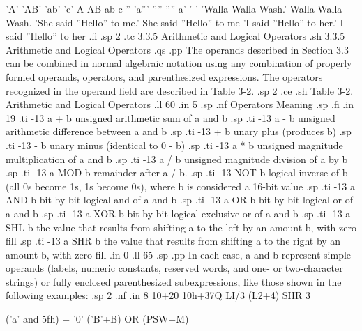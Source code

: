      'A' 'AB' 'ab' 'c'               A  AB  ab  c
     '' 'a''' '''' ''''                 a'  '   '
     'Walla Walla Wash.'             Walla Walla Wash.
     'She said ''Hello'' to me.'     She said ''Hello'' to me
     'I said ''Hello'' to her.'      I said ''Hello'' to her
.fi
.sp 2
.tc         3.3.5  Arithmetic and Logical Operators
.sh
3.3.5  Arithmetic and Logical Operators
.qs
.pp
The operands described in Section 3.3 can be combined in normal algebraic 
notation using any combination of properly formed operands, 
operators, and parenthesized expressions.  The operators 
recognized in the operand field are described in Table 3-2.
.sp 2
.ce
.sh
Table 3-2.  Arithmetic and Logical Operators
.ll 60
.in 5
.sp
.nf
Operators                         Meaning
.sp
.fi
.in 19
.ti -13
a + b        unsigned arithmetic sum of a and b
.sp
.ti -13
a - b        unsigned arithmetic difference between a and b
.sp
.ti -13
  + b        unary plus (produces b)
.sp
.ti -13
  - b        unary minus (identical to 0 - b)
.sp
.ti -13
a * b        unsigned magnitude multiplication of a and b
.sp
.ti -13
a / b        unsigned magnitude division of a by b
.sp
.ti -13
a MOD b      remainder after a / b.
.sp
.ti -13
NOT b        logical inverse of b (all 0s become 1s, 1s become 
0s), where b is considered a 16-bit value
.sp
.ti -13
a AND b      bit-by-bit logical and of a and b
.sp
.ti -13
a OR b       bit-by-bit logical or of a and b
.sp
.ti -13
a XOR b      bit-by-bit logical exclusive or of a and b
.sp
.ti -13
a SHL b      the value that results from shifting a to the left 
by an amount b, with zero fill
.sp
.ti -13
a SHR b      the value that results from shifting a to the 
right by an amount b, with zero fill
.in 0
.ll 65
.sp 
.pp
In each case, a and b represent simple operands (labels, numeric 
constants, reserved words, and one- or two-character strings) or 
fully enclosed parenthesized subexpressions, like those shown in 
the following examples:
.sp 2
.nf
.in 8
10+20  10h+37Q  LI/3  (L2+4) SHR 3

('a' and 5fh) + '0' ('B'+B) OR (PSW+M)

